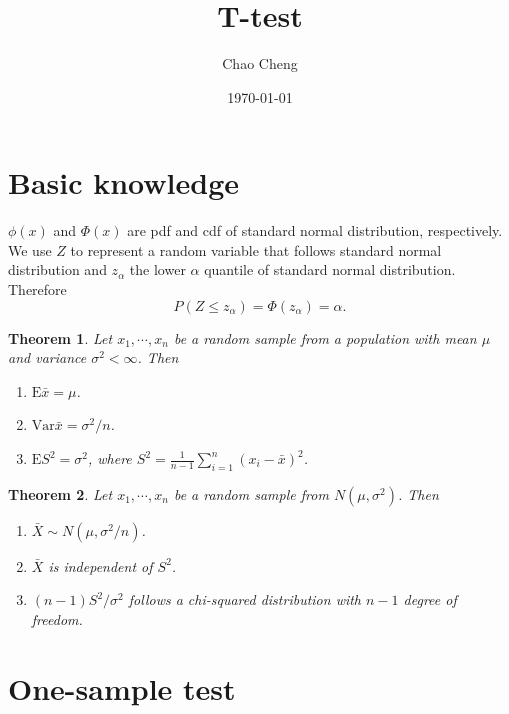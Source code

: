 \documentclass[a4paper,12pt]{article}
\title{T-test}
\author{Chao Cheng}
\date{\today}
\newtheorem{thm}{Theorem}
\begin{document}
\maketitle
\tableofcontents{}

\section{Basic knowledge}
\label{sec:basic-knowledge}

$\phi\left(x\right)$ and $\Phi\left(x\right)$ are pdf and cdf of standard normal distribution, respectively. We use $Z$ to represent a random variable that follows standard normal distribution and $z_{\alpha}$ the lower $\alpha$ quantile of standard normal distribution. Therefore
\[
  P\left(Z \leq z_{\alpha}\right) = \Phi\left(z_{\alpha}\right) = \alpha
  .
\]

\begin{thm}
  \label{thm:sample_thm}
  Let $x_1, \cdots, x_n$ be a random sample from a population with mean $\mu$ and variance $\sigma^2 <\infty$. Then
  \begin{enumerate}
  \item $\mathrm{E}\bar{x} = \mu$.
  \item $\mathrm{Var}\bar{x} = \sigma^2 / n$.
  \item $\mathrm{E}S^2 = \sigma^2$, where $S^2 = \frac{1}{n - 1}\sum\limits_{i = 1}^n\left(x_i - \bar{x}\right)^2$.
  \end{enumerate}
\end{thm}

\begin{thm}
  \label{thm:normal_thm}
  Let $x_1, \cdots, x_n$ be a random sample from $N\left(\mu, \sigma^2\right)$. Then
  \begin{enumerate}
  \item $\bar{X} \sim N\left(\mu, \sigma^2 / n\right)$.
  \item $\bar{X}$ is independent of $S^2$.
  \item $\left(n - 1\right)S^2 / \sigma^2$ follows a chi-squared distribution with $n - 1$ degree of freedom.
  \end{enumerate}
\end{thm}



\section{One-sample test}
\label{sec:one-sample}
\end{document}
